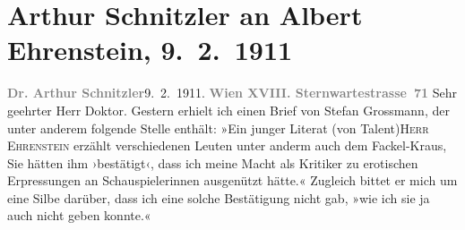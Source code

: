 

         
         \renewcommand{\erwaehntePersonen}{Personen: Albert Ehrenstein, Stefan Großmann, Karl Kraus}
         \renewcommand{\erwaehnteInstitutionen}{Institutionen: Die Fackel}
         \renewcommand{\erwaehnteOrte}{Orte: Sternwartestraße, Wien}
         \renewcommand{\erwaehnteWerke}{}
               \section[Arthur Schnitzler an Albert Ehrenstein, 9. 2. 1911]{ Arthur Schnitzler an Albert Ehrenstein, 9. 2. 1911}\nopagebreak{}\rehead{ }\begin{ledgroupsized}[t]{13cm}\normalsize\beginnumbering \toendnotes[C]{\smallbreak\pagebreak[2]} 
\pstart
           {\pb}\textcolor{gray}{\textbf{Dr. Arthur Schnitzler}}\hfill 9. 2. 1911.\pend
           \pstart
           \textcolor{gray}{\textbf{Wien XVIII. Sternwartestrasse 71}}\pend
           \pstart{}Sehr geehrter Herr Doktor.\pend\pstart
           Gestern erhielt ich einen Brief von Stefan
                  Grossmann, der unter anderem folgende Stelle enthält: »Ein junger Literat
                  \introOben{}(\introOben{}von Talent\introOben{})\introOben{}{ }\introOben{}\textsc{Herr Ehrenstein}\introOben{} erzählt verschiedenen Leuten unter anderm auch dem Fackel-Kraus, Sie hätten
               ihm ›bestätigt‹, dass ich meine Macht als Kritiker zu erotischen Erpressungen an
               Schauspielerinnen ausgenützt hätte.« Zugleich bittet er mich um eine Silbe darüber,
               dass ich eine solche Bestätigung nicht gab, \introOben{}»\introOben{}wie ich sie ja
               auch nicht geben konnte.\introOben{}«\introOben{}\pend

\end{ledgroupsized}
